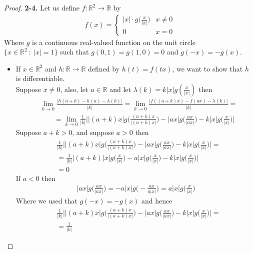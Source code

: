 \documentclass[11pt]{article}
\newcommand{\R}{\mathbb{R}}
\theoremstyle{definition}
\begin{document}
\cleardoublepage
\begin{proof}{\textbf{2-4.}}
Let us define $f:\R^2\to \R$ by
\begin{align*}
    f(x) = \begin{cases}
        |x|\cdot g\big(\frac{x}{|x|}\big) & x\neq 0\\
        0  & x = 0
    \end{cases}
\end{align*}
Where $g$ is a continuous real-valued function on the unit circle\\
$\{x \in \R^2~:~|x| = 1\}$ such that $g(0,1) = g(1,0) = 0$ and $g(-x) = -g(x)$.
\begin{itemize}
\item [(a)] If $x\in\R^2$ and $h:\R \to \R$ defined by $h(t) = f(tx)$, we want
to show that $h$ is differentiable.
\\
Suppose $x \neq 0$, also, let $a \in \R$ and let
$\lambda(k) = k|x|g(\frac{x}{|x|})$ then
\begin{align*}
    &\lim_{k \to 0} \frac{|h(a + k) - h(a) - \lambda(k)|}{|k|}
    = \lim_{k \to 0} \frac{|f((a + k)x) - f(ax) - \lambda(k)|}{|k|} =\\
    &\qquad= \lim_{k \to 0}
    \frac{1}{|k|}
    \bigg||(a + k)x|g\bigg(\frac{(a + k)x}{|(a + k)x|}\bigg)
    - |ax|g\bigg(\frac{ax}{|ax|}\bigg)
    - k|x|g\bigg(\frac{x}{|x|}\bigg)\bigg|
\end{align*}
Suppose $a + k > 0$, and suppose $a > 0$ then
\begin{align*}
    &\frac{1}{|k|}
    \bigg||(a + k)x|g\bigg(\frac{(a + k)x}{|(a + k)x|}\bigg)
    - |ax|g\bigg(\frac{ax}{|ax|}\bigg)
    - k|x|g\bigg(\frac{x}{|x|}\bigg)
    \bigg| = \\
    &= \frac{1}{|k|}
    \bigg|(a + k)|x|g\bigg(\frac{x}{|x|}\bigg)
    - a|x|g\bigg(\frac{x}{|x|}\bigg)
    - k|x|g\bigg(\frac{x}{|x|}\bigg)
    \bigg|\\
    &= 0
\end{align*}
If $a < 0$ then
\begin{align*}
    |ax|g\bigg(\frac{ax}{|ax|}\bigg)
    = -a|x|g\bigg(-\frac{ax}{a|x|}\bigg)
    = a|x|g\bigg(\frac{x}{|x|}\bigg)
\end{align*}
Where we used that $g(-x) = -g(x)$ and hence
\begin{align*}
    &\frac{1}{|k|}
    \bigg||(a + k)x|g\bigg(\frac{(a + k)x}{|(a + k)x|}\bigg)
    - |ax|g\bigg(\frac{ax}{|ax|}\bigg)
    - k|x|g\bigg(\frac{x}{|x|}\bigg)
    \bigg| =\\
    &= \frac{1}{|k|}

\end{align*}
\end{itemize}
\end{proof}
\end{document}
